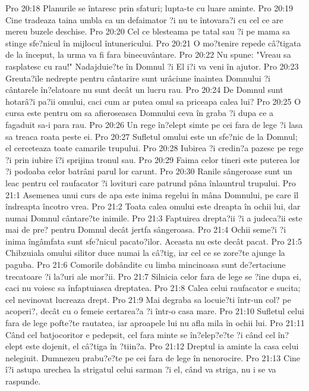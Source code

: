 Pro 20:18  Planurile se întaresc prin sfaturi; lupta-te cu luare aminte.
Pro 20:19  Cine tradeaza taina umbla ca un defaimator ?i nu te întovara?i cu cel ce are mereu buzele deschise.
Pro 20:20  Cel ce blesteama pe tatal sau ?i pe mama sa stinge sfe?nicul în mijlocul întunericului.
Pro 20:21  O mo?tenire repede câ?tigata de la început, la urma va fi fara binecuvântare.
Pro 20:22  Nu spune: "Vreau sa rasplatesc cu rau!" Nadajduie?te în Domnul ?i El i?i va veni în ajutor.
Pro 20:23  Greuta?ile nedrepte pentru cântarire sunt urâciune înaintea Domnului ?i cântarele în?elatoare nu sunt decât un lucru rau.
Pro 20:24  De Domnul sunt hotarâ?i pa?ii omului, caci cum ar putea omul sa priceapa calea lui?
Pro 20:25  O cursa este pentru om sa afieroseasca Domnului ceva în graba ?i dupa ce a fagaduit sa-i para rau.
Pro 20:26  Un rege în?elept simte pe cei fara de lege ?i lasa sa treaca roata peste ei.
Pro 20:27  Sufletul omului este un sfe?nic de la Domnul; el cerceteaza toate camarile trupului.
Pro 20:28  Iubirea ?i credin?a pazesc pe rege ?i prin iubire î?i sprijina tronul sau.
Pro 20:29  Faima celor tineri este puterea lor ?i podoaba celor batrâni parul lor carunt.
Pro 20:30  Ranile sângeroase sunt un leac pentru cel raufacator ?i lovituri care patrund pâna înlauntrul trupului.
Pro 21:1  Asemenea unui curs de apa este inima regelui în mâna Domnului, pe care îl îndreapta încotro vrea.
Pro 21:2  Toata calea omului este dreapta în ochii lui, dar numai Domnul cântare?te inimile.
Pro 21:3  Faptuirea drepta?ii ?i a judeca?ii este mai de pre? pentru Domnul decât jertfa sângeroasa.
Pro 21:4  Ochii seme?i ?i inima îngâmfata sunt sfe?nicul pacato?ilor. Aceasta nu este decât pacat.
Pro 21:5  Chibzuiala omului silitor duce numai la câ?tig, iar cel ce se zore?te ajunge la paguba.
Pro 21:6  Comorile dobândite cu limba mincinoasa sunt de?ertaciune trecatoare ?i la?uri ale mor?ii.
Pro 21:7  Silnicia celor fara de lege se ?ine dupa ei, caci nu voiesc sa înfaptuiasca dreptatea.
Pro 21:8  Calea celui raufacator e sucita; cel nevinovat lucreaza drept.
Pro 21:9  Mai degraba sa locuie?ti într-un col? pe acoperi?, decât cu o femeie certarea?a ?i într-o casa mare.
Pro 21:10  Sufletul celui fara de lege pofte?te rautatea, iar aproapele lui nu afla mila în ochii lui.
Pro 21:11  Când cel batjocoritor e pedepsit, cel fara minte se în?elep?e?te ?i când cel în?elept este dojenit, el câ?tiga în ?tiin?a.
Pro 21:12  Dreptul ia aminte la casa celui nelegiuit. Dumnezeu prabu?e?te pe cei fara de lege în nenorocire.
Pro 21:13  Cine î?i astupa urechea la strigatul celui sarman ?i el, când va striga, nu i se va raspunde.
